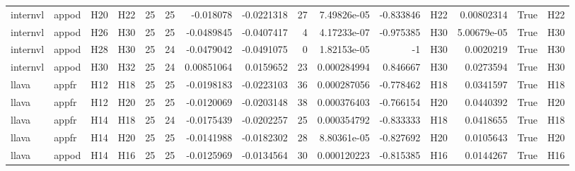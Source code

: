 \begin{longtable}{llllrrrrrrrlrrl}
internvl & appod & H20 & H22 & 25 & 25 & -0.018078 & -0.0221318 & 27 & 7.49826e-05 & -0.833846 & H22 & 0.00802314 & True & H22 \\
internvl & appod & H26 & H30 & 25 & 25 & -0.0489845 & -0.0407417 & 4 & 4.17233e-07 & -0.975385 & H30 & 5.00679e-05 & True & H30 \\
internvl & appod & H28 & H30 & 25 & 24 & -0.0479042 & -0.0491075 & 0 & 1.82153e-05 & -1 & H30 & 0.0020219 & True & H30 \\
internvl & appod & H30 & H32 & 25 & 24 & 0.00851064 & 0.0159652 & 23 & 0.000284994 & 0.846667 & H30 & 0.0273594 & True & H30 \\
llava & appfr & H12 & H18 & 25 & 25 & -0.0198183 & -0.0223103 & 36 & 0.000287056 & -0.778462 & H18 & 0.0341597 & True & H18 \\
llava & appfr & H12 & H20 & 25 & 25 & -0.0120069 & -0.0203148 & 38 & 0.000376403 & -0.766154 & H20 & 0.0440392 & True & H20 \\
llava & appfr & H14 & H18 & 25 & 24 & -0.0175439 & -0.0202257 & 25 & 0.000354792 & -0.833333 & H18 & 0.0418655 & True & H18 \\
llava & appfr & H14 & H20 & 25 & 25 & -0.0141988 & -0.0182302 & 28 & 8.80361e-05 & -0.827692 & H20 & 0.0105643 & True & H20 \\
llava & appod & H14 & H16 & 25 & 25 & -0.0125969 & -0.0134564 & 30 & 0.000120223 & -0.815385 & H16 & 0.0144267 & True & H16 \\
\end{longtable}
